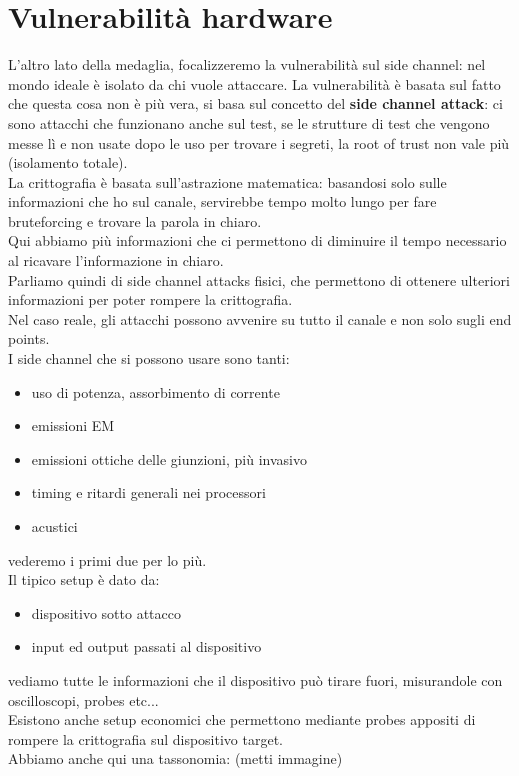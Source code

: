 \documentclass[oneside, 12pt]{extbook}
\begin{document}
\section{Vulnerabilità hardware}
L'altro lato della medaglia, focalizzeremo la vulnerabilità sul side channel: nel mondo ideale è isolato da chi vuole attaccare. La vulnerabilità è basata sul fatto che questa cosa non è più vera, si basa sul concetto del \textbf{side channel attack}: ci sono attacchi che funzionano anche sul test, se le strutture di test che vengono messe lì e non usate dopo le uso per trovare i segreti, la root of trust non vale più (isolamento totale).\\La crittografia è basata sull'astrazione matematica: basandosi solo sulle informazioni che ho sul canale, servirebbe tempo molto lungo per fare bruteforcing e trovare la parola in chiaro.\\Qui abbiamo più informazioni che ci permettono di diminuire il tempo necessario al ricavare l'informazione in chiaro.\\Parliamo quindi di side channel attacks fisici, che permettono di ottenere ulteriori informazioni per poter rompere la crittografia.\\Nel caso reale, gli attacchi possono avvenire su tutto il canale e non solo sugli end points.\\I side channel che si possono usare sono tanti:
\begin{itemize}
	\item uso di potenza, assorbimento di corrente
	\item emissioni EM
	\item emissioni ottiche delle giunzioni, più invasivo
	\item timing e ritardi generali nei processori
	\item acustici
\end{itemize}
vederemo i primi due per lo più.\\Il tipico setup è dato da:
\begin{itemize}
	\item dispositivo sotto attacco
	\item input ed output passati al dispositivo
\end{itemize}
vediamo tutte le informazioni che il dispositivo può tirare fuori, misurandole con oscilloscopi, probes etc...\\Esistono anche setup economici che permettono mediante probes appositi di rompere la crittografia sul dispositivo target.\\Abbiamo anche qui una tassonomia: (metti immagine)
\end{document}
